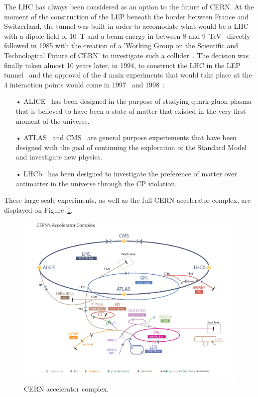 	The LHC has always been considered as an option to the future of CERN. At the moment of the construction of the LEP beneath the border between France and Switzerland, the tunnel was built in order to accomodate what would be a \acl{LHC} with a dipole field of \SI{10}{T} and a beam energy in between 8 and \SI{9}{TeV}~\cite{ANNUALREPORT1984} directly followed in 1985 with the creation of a 'Working Group on the Scientific and Technological Future of CERN' to investigate such a collider~\cite{ANNUALREPORT1985}. The decision was finally taken almost 10 years later, in 1994, to construct the LHC in the LEP tunnel~\cite{ANNUALREPORT1994} and the approval of the 4 main experiments that would take place at the 4 interaction points would come in 1997~\cite{ANNUALREPORT1997} and 1998~\cite{ANNUALREPORT1998}:
	
	\begin{itemize}
		\item[•] ALICE~\cite{ALICELOI} has been designed in the purpose of studying quark-gluon plasma that is believed to have been a state of matter that existed in the very first moment of the universe.
		\item[•] ATLAS~\cite{ATLASLOI} and CMS~\cite{CMSLOI} are general purpose experiements that have been designed with the goal of continuing the exploration of the Standard Model and investigate new physics.
		\item[•] LHCb~\cite{LHCBLOI} has been designed to investigate the preference of matter over antimatter in the universe through the CP violation.
	\end{itemize}
	
	These large scale experiments, as well as the full CERN accelerator complex, are displayed on Figure~\ref{fig:CERNComplex}.

	\begin{figure}[H]
		\centering
		\hspace*{-0.1\linewidth}
		\includegraphics[width=1.2\linewidth]{fig/chapt2/CERN_Accelerator_Complex.png}
		\caption{\label{fig:CERNComplex} CERN accelerator complex.}
	\end{figure}
	
